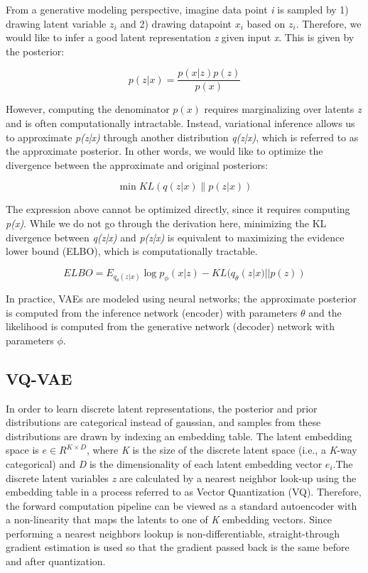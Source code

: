 \documentclass{article}
\begin{document}
From a generative modeling perspective, imagine data point \textit{i} is sampled by 1) drawing latent variable \(z_{i}\) and 2) drawing datapoint \(x_{i}\) based on \(z_{i}\). Therefore, we would like to infer a good latent representation \textit{z} given input \textit{x}. This is given by the posterior:

\begin{equation}
    p(z|x) = \frac{p(x|z)p(z)}{p(x)}
\end{equation}

However, computing the denominator \(p(x)\) requires marginalizing over latents \textit{z} and is often computationally intractable. Instead, variational inference allows us to approximate \textit{p(z|x)} through another distribution \textit{q(z|x)}, which is referred to as the approximate posterior. In other words, we would like to optimize the divergence between the approximate and original posteriors:

\begin{equation}
    \min{KL(q(z|x) \| p(z|x))} 
\end{equation}

The expression above cannot be optimized directly, since it requires computing \textit{p(x)}. While we do not go through the derivation here, minimizing the KL divergence between \textit{q(z|x)} and \textit{p(z|x)} is equivalent to maximizing the evidence lower bound (ELBO), which is computationally tractable. 

\begin{equation}
ELBO = E_{q_{\theta}(z|x)} \log{p_{\phi}(x|z)} - KL(q_{\theta}(z|x)||p(z))
\end{equation}

In practice, VAEs are modeled using neural networks; the approximate posterior is computed from the inference network (encoder) with parameters \(\theta\) and the likelihood is computed from the generative network (decoder) network with parameters \(\phi\). 
\subsection{VQ-VAE}
In order to learn discrete latent representations, the posterior and prior distributions are categorical instead of gaussian, and samples from these distributions are drawn by indexing an embedding table. The latent embedding space is \(e \in R^{K \times D}\), where \textit{K} is the size of the discrete latent space (i.e., a \textit{K}-way categorical) and \textit{D} is the dimensionality of each latent embedding vector \(e_{i}\).The discrete latent variables \textit{z} are calculated by a nearest neighbor look-up using the embedding table in a process referred to as Vector Quantization (VQ). Therefore, the forward computation pipeline can be viewed as a standard autoencoder with a non-linearity that maps the latents to one of \textit{K} embedding vectors. Since performing a nearest neighbors lookup is non-differentiable, straight-through gradient estimation is used so that the gradient passed back is the same before and after quantization. 
\end{document}
